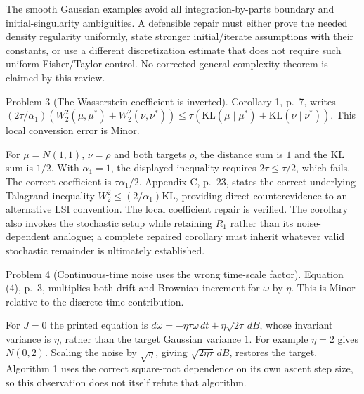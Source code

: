\documentclass[10pt]{article}
\begin{document}
The smooth Gaussian examples avoid all integration-by-parts boundary and initial-singularity ambiguities. A defensible repair must either prove the needed density regularity uniformly, state stronger initial/iterate assumptions with their constants, or use a different discretization estimate that does not require such uniform Fisher/Taylor control. No corrected general complexity theorem is claimed by this review.\par
Problem 3 (The Wasserstein coefficient is inverted).  Corollary 1, p. 7, writes \((2\tau/\alpha_1)(W_2^2(\mu,\mu^*)+
W_2^2(\nu,\nu^*))\leq\tau(\mathrm{KL}(\mu\mid\mu^*)+
\mathrm{KL}(\nu\mid\nu^*))\). This local conversion error is Minor.\par
For \(\mu=N(1,1)\), \(\nu=\rho\) and both targets \(\rho\), the distance sum is \(1\) and the KL sum is \(1/2\). With \(\alpha_1=1\), the displayed inequality requires \(2\tau\leq\tau/2\), which fails. The correct coefficient is \(\tau\alpha_1/2\). Appendix C, p. 23, states the correct underlying Talagrand inequality \(W_2^2\leq(2/\alpha_1)\mathrm{KL}\), providing direct counterevidence to an alternative LSI convention. The local coefficient repair is verified. The corollary also invokes the stochastic setup while retaining \(R_1\) rather than its noise-dependent analogue; a complete repaired corollary must inherit whatever valid stochastic remainder is ultimately established.\par
Problem 4 (Continuous-time noise uses the wrong time-scale factor).  Equation (4), p. 3, multiplies both drift and Brownian increment for \(\omega\) by \(\eta\). This is Minor relative to the discrete-time contribution.\par
For \(J=0\) the printed equation is \(d\omega=-\eta\tau\omega\,dt+\eta\sqrt{2\tau}\,dB\), whose invariant variance is \(\eta\), rather than the target Gaussian variance \(1\). For example \(\eta=2\) gives \(N(0,2)\). Scaling the noise by \(\sqrt{\eta}\), giving \(\sqrt{2\eta\tau}\,dB\), restores the target. Algorithm 1 uses the correct square-root dependence on its own ascent step size, so this observation does not itself refute that algorithm.\par
\end{document}
